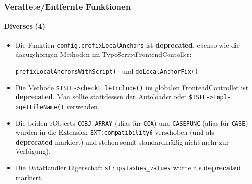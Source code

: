 \begin{frame}[fragile]
	\frametitle{Veraltete/Entfernte Funktionen}
	\framesubtitle{Diverses (4)}

	\lstset{basicstyle=\tiny\ttfamily}

	\begin{itemize}

		\item Die Funktion
			\small\texttt{config.prefixLocalAnchors}\normalsize\space
			ist \textbf{deprecated}, ebenso wie die dazugehörigen Methoden
			im TypoScriptFrontendContoller:

			\small\texttt{prefixLocalAnchorsWithScript()}\normalsize\space
			und
			\small\texttt{doLocalAnchorFix()}\normalsize

		\item Die Methode
			\small\texttt{\$TSFE->checkFileInclude()}\normalsize\space
			im globalen FrontendController ist \textbf{deprecated}.
			Man sollte stattdessen den Autoloader oder \texttt{\$TSFE->tmpl->getFileName()}
			verwenden.

		\item Die beiden cObjects
			\small\texttt{COBJ\_ARRAY}\normalsize\space
			(alias für \texttt{COA})
			und
			\small\texttt{CASEFUNC}\normalsize\space
			(alias für \texttt{CASE})
			wurden in die Extension \texttt{EXT:compatibility6} verschoben
			(und als \textbf{deprecated} markiert) und stehen somit standardmäßig nicht
			mehr zur Verfügung).

		\item Die DataHandler Eigenschaft
			\small\texttt{stripslashes\_values}\normalsize\space
			wurde als \textbf{deprecated} markiert.

	\end{itemize}

\end{frame}


